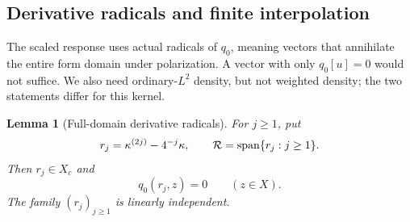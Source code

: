 \documentclass[11pt,a4paper]{article}
\numberwithin{equation}{section}
\newtheorem{lemma}[theorem]{Lemma}
\theoremstyle{definition}\newtheorem{definition}[theorem]{Definition}
\theoremstyle{remark}\newtheorem{remark}[theorem]{Remark}
\begin{document}
\subsection{Derivative radicals and finite interpolation}\label{a:sec:radical}

The scaled response uses actual radicals of $q_0$, meaning vectors that annihilate the entire form domain under polarization. A vector with only $q_0[u]=0$ would not suffice. We also need ordinary-$L^2$ density, but not weighted density; the two statements differ for this kernel.

\begin{lemma}[Full-domain derivative radicals]\label{a:lem:radical}
For $j\ge1$, put
\begin{equation}\label{a:eq:radical}
 r_j=\kappa^{(2j)}-4^{-j}\kappa,\qquad
 \mathcal R=\operatorname{span}\{r_j:j\ge1\}.
\end{equation}
Then $r_j\in X_c$ and
\begin{equation}\label{a:eq:radicalidentity}
 q_0(r_j,z)=0\qquad(z\in X).
\end{equation}
The family $(r_j)_{j\ge1}$ is linearly independent.
\end{lemma}
\end{document}

